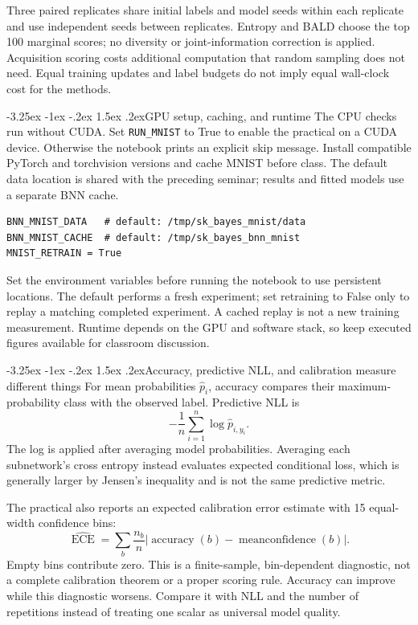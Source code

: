 \documentclass[11pt,a4paper]{article}
\makeatletter
\renewcommand\subsection{\@startsection{subsection}{2}{\z@}%
  {-3.25ex \@plus -1ex \@minus -.2ex}%
  {1.5ex \@plus .2ex}{\normalfont\large}}
\makeatother
\begin{document}
Three paired replicates share initial labels and model seeds within each
replicate and use independent seeds between replicates. Entropy and BALD
choose the top 100 marginal scores; no diversity or joint-information
correction is applied. Acquisition scoring costs additional computation that
random sampling does not need. Equal training updates and label budgets do
not imply equal wall-clock cost for the methods.

\subsection{GPU setup, caching, and runtime}
The CPU checks run without CUDA. Set \texttt{RUN\_MNIST} to True to enable
the practical on a CUDA device. Otherwise the notebook prints an explicit
skip message. Install compatible PyTorch and torchvision versions and cache MNIST
before class. The default data location is shared with the preceding seminar;
results and fitted models use a separate BNN cache.

\begin{lstlisting}
BNN_MNIST_DATA   # default: /tmp/sk_bayes_mnist/data
BNN_MNIST_CACHE  # default: /tmp/sk_bayes_bnn_mnist
MNIST_RETRAIN = True
\end{lstlisting}
Set the environment variables before running the notebook to use persistent
locations. The default performs a fresh experiment; set retraining to False
only to replay a matching completed experiment. A cached replay is not a new
training measurement. Runtime depends on the GPU and software stack, so keep
executed figures available for classroom discussion.

\subsection{Accuracy, predictive NLL, and calibration measure different things}
For mean probabilities $\widehat p_i$, accuracy compares their maximum-probability
class with the observed label. Predictive NLL is
\[
 -\frac1n\sum_{i=1}^n\log\widehat p_{i,y_i}.
\]
The log is applied after averaging model probabilities. Averaging each
subnetwork's cross entropy instead evaluates expected conditional loss, which
is generally larger by Jensen's inequality and is not the same predictive
metric.

The practical also reports an expected calibration error estimate with 15
equal-width confidence bins:
\[
 \widehat{\operatorname{ECE}}
 =\sum_b\frac{n_b}{n}
  |\operatorname{accuracy}(b)-\operatorname{meanconfidence}(b)|.
\]
Empty bins contribute zero. This is a finite-sample, bin-dependent diagnostic,
not a complete calibration theorem or a proper scoring rule. Accuracy can
improve while this diagnostic worsens. Compare it with NLL and the number
of repetitions instead of treating one scalar as universal model quality.
\end{document}
